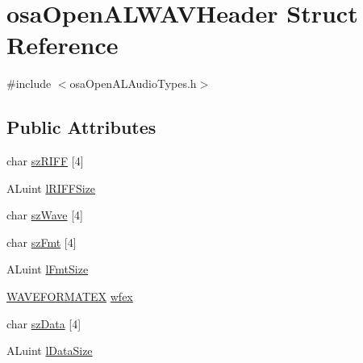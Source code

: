 \hypertarget{structosa_open_a_l_w_a_v_header}{\section{osa\-Open\-A\-L\-W\-A\-V\-Header Struct Reference}
\label{structosa_open_a_l_w_a_v_header}
}


{\ttfamily \#include $<$osa\-Open\-A\-L\-Audio\-Types.\-h$>$}

\subsection*{Public Attributes}
\begin{DoxyCompactItemize}
\item 
char \hyperlink{structosa_open_a_l_w_a_v_header_a098b6f18d3e7817dfeba64ae1494d0f2}{sz\-R\-I\-F\-F} \mbox{[}4\mbox{]}
\item 
A\-Luint \hyperlink{structosa_open_a_l_w_a_v_header_a04e8f4c2ebbf85c469a39ea853e7cb30}{l\-R\-I\-F\-F\-Size}
\item 
char \hyperlink{structosa_open_a_l_w_a_v_header_a00ca16e2cba4d79c653c1a0d49ca4661}{sz\-Wave} \mbox{[}4\mbox{]}
\item 
char \hyperlink{structosa_open_a_l_w_a_v_header_a33de8f968564c7835cda9715a9f51956}{sz\-Fmt} \mbox{[}4\mbox{]}
\item 
A\-Luint \hyperlink{structosa_open_a_l_w_a_v_header_a983ec0809ed5b0c048f690c82507a837}{l\-Fmt\-Size}
\item 
\hyperlink{struct_w_a_v_e_f_o_r_m_a_t_e_x}{W\-A\-V\-E\-F\-O\-R\-M\-A\-T\-E\-X} \hyperlink{structosa_open_a_l_w_a_v_header_a1bb12a739dfc5150d78795214c528d8a}{wfex}
\item 
char \hyperlink{structosa_open_a_l_w_a_v_header_ad8a2cc5a4501d35bff7d80ea75af0fc4}{sz\-Data} \mbox{[}4\mbox{]}
\item 
A\-Luint \hyperlink{structosa_open_a_l_w_a_v_header_af0e05d9dcd89274788369693a7c4ebaf}{l\-Data\-Size}
\end{DoxyCompactItemize}


